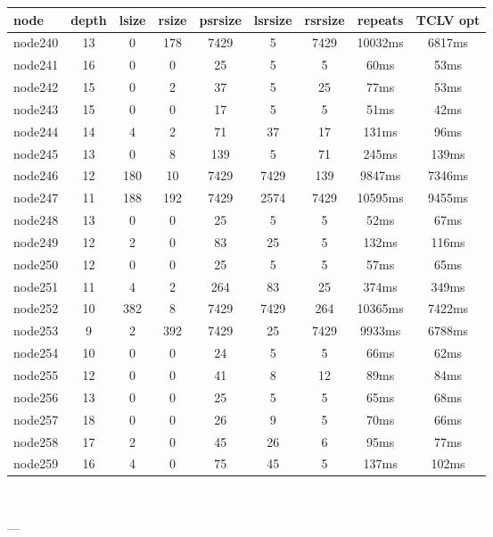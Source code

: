 \begin{tabular}{|l|c|c|c|c|c|c|c|c|}
\hline node & depth & lsize & rsize & psrsize & lsrsize & rsrsize   & repeats & TCLV opt\\
    \hline node240 & 13 & 0 & 178 & 7429 & 5 & 7429 & 10032ms & 6817ms\\
    \hline node241 & 16 & 0 & 0 & 25 & 5 & 5 & 60ms & 53ms\\
    \hline node242 & 15 & 0 & 2 & 37 & 5 & 25 & 77ms & 53ms\\
    \hline node243 & 15 & 0 & 0 & 17 & 5 & 5 & 51ms & 42ms\\
    \hline node244 & 14 & 4 & 2 & 71 & 37 & 17 & 131ms & 96ms\\
    \hline node245 & 13 & 0 & 8 & 139 & 5 & 71 & 245ms & 139ms\\
    \hline node246 & 12 & 180 & 10 & 7429 & 7429 & 139 & 9847ms & 7346ms\\
    \hline node247 & 11 & 188 & 192 & 7429 & 2574 & 7429 & 10595ms & 9455ms\\
    \hline node248 & 13 & 0 & 0 & 25 & 5 & 5 & 52ms & 67ms\\
    \hline node249 & 12 & 2 & 0 & 83 & 25 & 5 & 132ms & 116ms\\
    \hline node250 & 12 & 0 & 0 & 25 & 5 & 5 & 57ms & 65ms\\
    \hline node251 & 11 & 4 & 2 & 264 & 83 & 25 & 374ms & 349ms\\
    \hline node252 & 10 & 382 & 8 & 7429 & 7429 & 264 & 10365ms & 7422ms\\
    \hline node253 & 9 & 2 & 392 & 7429 & 25 & 7429 & 9933ms & 6788ms\\
    \hline node254 & 10 & 0 & 0 & 24 & 5 & 5 & 66ms & 62ms\\
    \hline node255 & 12 & 0 & 0 & 41 & 8 & 12 & 89ms & 84ms\\
    \hline node256 & 13 & 0 & 0 & 25 & 5 & 5 & 65ms & 68ms\\
    \hline node257 & 18 & 0 & 0 & 26 & 9 & 5 & 70ms & 66ms\\
    \hline node258 & 17 & 2 & 0 & 45 & 26 & 6 & 95ms & 77ms\\
    \hline node259 & 16 & 4 & 0 & 75 & 45 & 5 & 137ms & 102ms\\

\hline
\end{tabular} \

---



